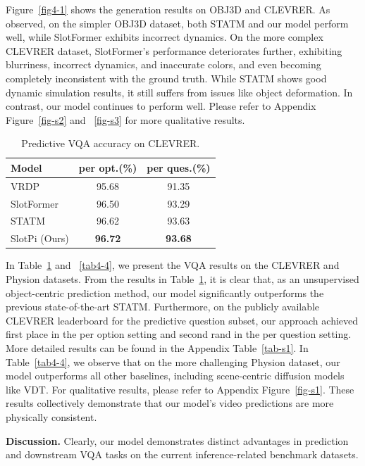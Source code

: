 \documentclass[sigconf]{acmart}
\begin{document}
Figure~\ref{fig4-1} shows the generation results on OBJ3D and CLEVRER. As observed, on the simpler OBJ3D dataset, both STATM and our model perform well, while SlotFormer exhibits incorrect dynamics. On the more complex CLEVRER dataset, SlotFormer’s performance deteriorates further, exhibiting blurriness, incorrect dynamics, and inaccurate colors, and even becoming completely inconsistent with the ground truth. While STATM shows good dynamic simulation results, it still suffers from issues like object deformation. In contrast, our model continues to perform well. Please refer to Appendix Figure~\ref{fig-s2} and ~\ref{fig-s3} for more qualitative results.

\begin{table}[t!]
\caption{Predictive VQA accuracy on CLEVRER.}
\label{tab4-3}
\vspace{-10pt}
\begin{tabular}{lcc}
\toprule
{\bf Model}&{\bf per opt.}(\%)&{\bf per ques.}(\%)\\
\midrule
VRDP&95.68&91.35\\
SlotFormer&96.50&93.29 \\
STATM&96.62&93.63 \\
SlotPi (Ours)&\textbf{96.72}&\textbf{93.68} \\
\bottomrule
\end{tabular}
\vspace{-6pt}
\end{table}


In Table~\ref{tab4-3} and ~\ref{tab4-4}, we present the VQA results on the CLEVRER and Physion datasets. From the results in Table~\ref{tab4-3}, it is clear that, as an unsupervised object-centric prediction method, our model significantly outperforms the previous state-of-the-art STATM. Furthermore, on the publicly available CLEVRER leaderboard for the predictive question subset, our approach achieved first place in the per option setting and second rand in the per question setting. More detailed results can be found in the Appendix Table~\ref{tab-s1}. In Table~\ref{tab4-4}, we observe that on the more challenging Physion dataset, our model outperforms all other baselines, including scene-centric diffusion models like VDT. For qualitative results, please refer to Appendix Figure~\ref{fig-s1}. These results collectively demonstrate that our model's video predictions are more physically consistent.

\textbf{Discussion.} Clearly, our model demonstrates distinct advantages in prediction and downstream VQA tasks on the current inference-related benchmark datasets.
\end{document}
